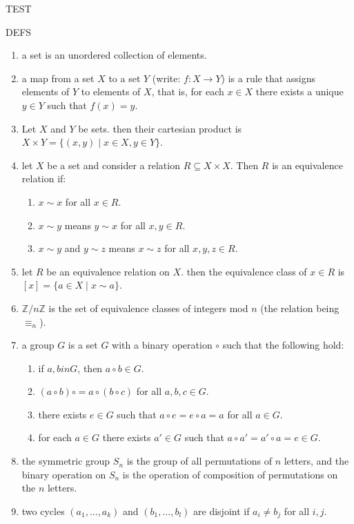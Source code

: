 

\begin{center}
	TEST
\end{center}
DEFS
\begin{enumerate}
	\item a set is an unordered collection of elements. 
	\item a map from a set $X$ to a set $Y$ (write: $f: X \to Y$) is a rule that assigns elements of $Y$ to elements of $X$, that is, for each $x \in X$ there exists a unique $y \in Y$ such that $f(x)=y$. 
	\item Let $X$ and $Y$ be sets. then their cartesian product is $X \times Y = \{(x,y) \mid x \in X, y \in Y\}$. 
	\item let $X$ be a set and consider a relation $R \subseteq X \times X$. Then $R$ is an equivalence relation if: 
	\begin{enumerate}
		\item $x \sim x$ for all $x \in R$. 
		\item $x \sim y$ means $y \sim x$ for all $x,y \in R$. 
		\item $x \sim y$ and $y \sim z$ means $x \sim z$ for all $x,y,z \in R$. 
	\end{enumerate}
	\item let $R$ be an equivalence relation on $X$. then the equivalence class of $x \in R$ is $[x] = \{a \in X \mid x \sim a\}$. 
	\item $\mathbb{Z}/n\mathbb{Z}$ is the set of equivalence classes of integers mod $n$ (the relation being $\equiv_n$). 
	\item a group $G$ is a set $G$ with a binary operation $\circ$ such that the following hold: 
	\begin{enumerate}
		\item if $a,b in G$, then $a \circ b \in G$. 
		\item $(a \circ b) \circ = a \circ (b \circ c)$ for all $a,b,c \in G$. 
		\item there exists $e \in G$ such that $a \circ e = e \circ a = a$ for all $a \in G$.
		\item for each $a \in G$ there exists $a' \in G$ such that $a \circ a' = a' \circ a = e \in G$. 
	\end{enumerate}
	\item the symmetric group $S_n$ is the group of all permutations of $n$ letters, and the binary operation on $S_n$ is the operation of composition of permutations on the $n$ letters. 
	\item two cycles $(a_1,\dots,a_k)$ and $(b_1,\dots,b_l)$ are disjoint if $a_i \neq b_j$ for all $i,j$. 

\end{enumerate}

